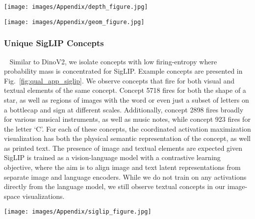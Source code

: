 \begin{figure*}[t]
    \centering
    \texttt{[image: images/Appendix/depth\_figure.jpg]}
    \caption{\textbf{Qualitative results of low-entropy concepts that fire for DinoV2.} We discover features related to depth cues for foreground objects as well as background in concept 4756 (above) and 1710 (below).}
    \label{fig:qual_app_depth}
\end{figure*}

\begin{figure*}[t]
    \centering
    \texttt{[image: images/Appendix/geom\_figure.jpg]}
    \caption{\textbf{Qualitative results for low-entropy concepts that fire for DinoV2.} We discover DinoV2 independent features that are not universal suggesting 3D understanding like corners (concepts 1530), top face of rectangular prism (concept 4191), and brim of dome (concept 3448).}
    \label{fig:qual_app_geometry}
\end{figure*}


\subsubsection{Unique SigLIP Concepts}~\label{appendix:unique_siglip}
Similar to DinoV2, we isolate concepts with low firing-entropy where probability mass is concentrated for SigLIP. Example concepts are presented in Fig.~\ref{fig:qual_app_siglip}. We observe concepts that fire for both visual and textual elements of the same concept. Concept 5718 fires for both the shape of a star, as well as regions of images with the word or even just a subset of letters on a bottlecap and sign at different scales. Additionally, concept 2898 fires broadly for various musical instruments, as well as music notes, while concept 923 fires for the letter `C'. For each of these concepts, the coordinated activation maximization visualization has both the physical semantic representation of the concept, as well as printed text. The presence of image and textual elements are expected given SigLIP is trained as a vision-language model with a contrastive learning objective, where the aim is to align image and text latent representations from separate image and language encoders. While we do not train on any activations directly from the language model, we still observe textual concepts in our image-space visualizations.   

\begin{figure*}[t]
    \centering
    \texttt{[image: images/Appendix/siglip\_figure.jpg]}
    \caption{\textbf{Qualitative results of low-entropy SigLIP concepts.} We consistently find concepts that fire for abstract concepts in image space such as images or text of `star' (concept 923), letters (concept 5718), and music notes (concept 2958).
    }
    \label{fig:qual_app_siglip}
\end{figure*}



